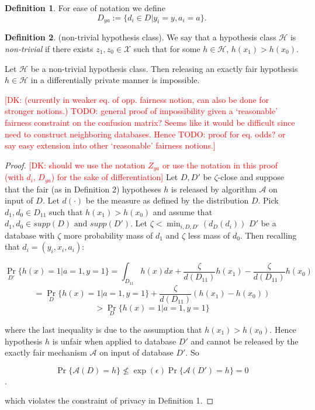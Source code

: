 \documentclass[format = sigconf]{acmart}
\newcommand{\dk}[1]{\textcolor{red}{[DK: #1]}}
\newcommand{\A}{\mathcal{A}}
\renewcommand{\H}{\mathcal{H}}
\newcommand{\1}{\mathbbm{1}}
\newcommand{\eps}{\epsilon}
\newcommand{\zt}{\zeta}
\theoremstyle{definition}
\newtheorem{defn}{Definition}[section]
\begin{document}
\begin{defn}
	For ease of notation we define
	$$D_{ya} := \{d_i \in D | y_i = y, a_i = a \}.$$
\end{defn}
\begin{defn}
	(non-trivial hypothesis class). We say that a hypothesis class $\H$ is  \emph{non-trivial} if there exists $z_1, z_0 \in \mathcal{X}$ such that for some $h \in \H$, $h(x_1) > h(x_0)$.
\end{defn}
\begin{lemma}Let $\mathcal{H}$ be a non-trivial hypothesis class. Then
  releasing an exactly fair hypothesis $h\in \mathcal{H}$ in a
  differentially private manner is impossible.
\end{lemma}
\dk{ (currently in weaker eq. of opp. fairness notion, can also be done
for stronger notions.) TODO: general proof of impossibility given a
`reasonable' fairness constraint on the confusion matrix? Seems like it
would be difficult since need to construct neighboring databases. Hence
TODO: proof for eq. odds? or say easy extension into other `reasonable'
fairness notions.}

\begin{proof}
	\dk{should we use the notation $Z_{ya}$ or use the notation in this
		proof (with $d_i$, $D_{ya}$) for the sake of differentiation}
	Let $D, D'$ be $\zt$-close and suppose that the fair (as in
  Definition 2) hypotheses $h$ is released by algorithm $\mathcal{A}$
  on input of $D$. Let $d(\cdot)$ be the measure as defined by the
  distribution $D$. Pick $d_1, d_0 \in D_{11}$ such that $h(x_1) >
  h(x_0)$ and assume that $d_1, d_0 \in supp(D) \text{ and } supp(D')$.
  Let $\zt < \min_{i,D,D'}(d_{D}(d_i))$ $D'$ be a database with $\zt$
  more probability mass of $d_1$ and $\zt$ less mass of $d_0$. Then
  recalling that $d_i = (y_i, x_i, a_i)$:

$$\Pr_{D'}\{h(x) = 1 | a = 1, y=1\} = \int_{D_{11}}h(x)dx +
\frac{\zt}{d(D_{11})} h(x_1) - \frac{\zt}{d(D_{11})} h(x_0) $$
$$= \Pr_{D}\{h(x) = 1 | a = 1, y=1\} + \frac{\zt}{d(D_{11})} (h(x_1) - h(x_0))$$
$$>  \Pr_{D}\{h(x) = 1 | a = 1, y=1\}$$

where the last inequality is due to the assumption that $h(x_1) >
h(x_0)$. Hence hypothesis $h$ is unfair when applied to database $D'$
and cannot be released by the exactly fair mechanism $\A$ on input of
database $D'$. So

$$\Pr\{\mathcal{A}(D) = h\} \not\leq \exp(\eps)\Pr\{\mathcal{A}(D') = h\} = 0$$.

which violates the constraint of privacy in Definition 1.
\end{proof}
\end{document}
